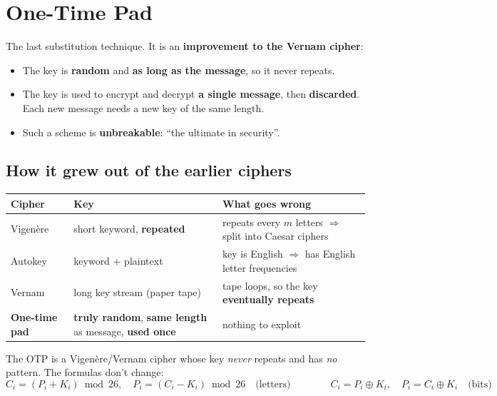 \newcommand{\railfence}[1]{%
  \foreach \l/\r [count=\i] in {#1}{\node[font=\small] (rf\i) at (\i*0.5,-\r*0.6) {\l};}}

\section{One-Time Pad}\label{sec:otp}

The last substitution technique. It is an \textbf{improvement to the Vernam cipher}:
\begin{keybox}[title=One-time pad]
\begin{itemize}
  \item The key is \textbf{random} and \textbf{as long as the message}, so it never repeats.
  \item The key is used to encrypt and decrypt \textbf{a single message}, then \textbf{discarded}. Each new message needs a new key of the same length.
  \item Such a scheme is \textbf{unbreakable}: ``the ultimate in security''.
\end{itemize}
\end{keybox}

\subsection{How it grew out of the earlier ciphers}
\begin{center}\small
\begin{tabularx}{\textwidth}{@{}l X X@{}}
\toprule
Cipher & Key & What goes wrong\\
\midrule
Vigen\`ere & short keyword, \textbf{repeated} & repeats every $m$ letters $\Rightarrow$ split into Caesar ciphers\\
Autokey & keyword + plaintext & key is English $\Rightarrow$ has English letter frequencies\\
Vernam & long key stream (paper tape) & tape loops, so the key \textbf{eventually repeats}\\
\textbf{One-time pad} & \textbf{truly random}, \textbf{same length} as message, \textbf{used once} & nothing to exploit\\
\bottomrule
\end{tabularx}
\end{center}
The OTP is a Vigen\`ere/Vernam cipher whose key \emph{never} repeats and has \emph{no} pattern. The formulas don't change:
\[
C_i = (P_i + K_i) \bmod 26,\quad P_i = (C_i - K_i) \bmod 26 \quad\text{(letters)}\qquad\qquad C_i = P_i \oplus K_i,\quad P_i = C_i \oplus K_i \quad\text{(bits)}
\]

